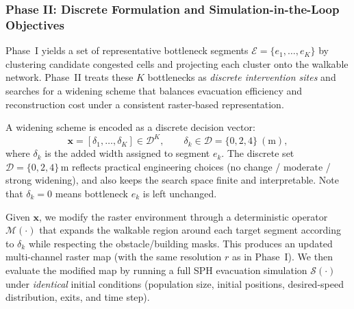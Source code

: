 \documentclass[preprint,12pt]{elsarticle}
\begin{document}
\subsubsection{Phase II: Discrete Formulation and Simulation-in-the-Loop Objectives}
\label{sec:method_formulation}
Phase~I yields a set of representative bottleneck segments
$\mathcal{E}=\{e_1,\ldots,e_K\}$ by clustering candidate congested cells and projecting each cluster onto the walkable network.
Phase~II treats these $K$ bottlenecks as \emph{discrete intervention sites} and searches for a widening scheme
that balances evacuation efficiency and reconstruction cost under a consistent raster-based representation.

A widening scheme is encoded as a discrete decision vector:
\begin{equation}
\boldsymbol{x}=[\delta_1,\ldots,\delta_K]\in\mathcal{D}^K,\qquad
\delta_k\in\mathcal{D}=\{0,2,4\}\ (\mathrm{m}),
\label{eq:decision}
\end{equation}
where $\delta_k$ is the added width assigned to segment $e_k$.
The discrete set $\mathcal{D}=\{0,2,4\}$\,m reflects practical engineering choices (no change / moderate / strong widening),
and also keeps the search space finite and interpretable.
Note that $\delta_k=0$ means bottleneck $e_k$ is left unchanged.

Given $\boldsymbol{x}$, we modify the raster environment through a deterministic operator $\mathcal{M}(\cdot)$
that expands the walkable region around each target segment according to $\delta_k$ while respecting the obstacle/building masks.
This produces an updated multi-channel raster map (with the same resolution $r$ as in Phase~I).
We then evaluate the modified map by running a full SPH evacuation simulation $\mathcal{S}(\cdot)$
under \emph{identical} initial conditions (population size, initial positions, desired-speed distribution, exits, and time step).
\end{document}

